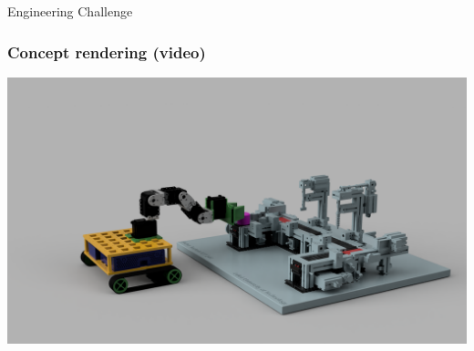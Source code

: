 \begin{frame}
    \begin{center}
    \Huge Engineering Challenge
    \end{center}
\end{frame}



\begin{frame}
    \frametitle{Concept rendering (video)}
    \includegraphics[width=\textwidth]{frames/img/b4_manufacturing.PNG}
\end{frame}

